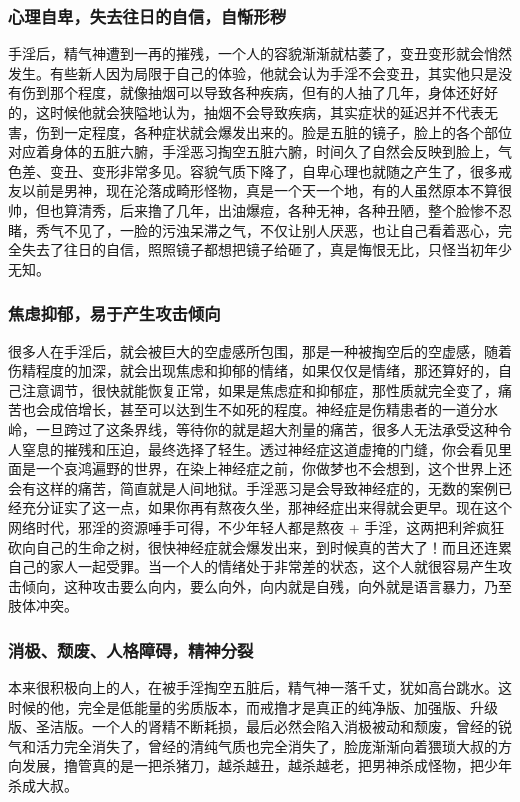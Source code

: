 \subsubsection{心理自卑，失去往日的自信，自惭形秽}

手淫后，精气神遭到一再的摧残，一个人的容貌渐渐就枯萎了，变丑变形就会悄然发生。有些新人因为局限于自己的体验，他就会认为手淫不会变丑，其实他只是没有伤到那个程度，就像抽烟可以导致各种疾病，但有的人抽了几年，身体还好好的，这时候他就会狭隘地认为，抽烟不会导致疾病，其实症状的延迟并不代表无害，伤到一定程度，各种症状就会爆发出来的。脸是五脏的镜子，脸上的各个部位对应着身体的五脏六腑，手淫恶习掏空五脏六腑，时间久了自然会反映到脸上，气色差、变丑、变形非常多见。容貌气质下降了，自卑心理也就随之产生了，很多戒友以前是男神，现在沦落成畸形怪物，真是一个天一个地，有的人虽然原本不算很帅，但也算清秀，后来撸了几年，出油爆痘，各种无神，各种丑陋，整个脸惨不忍睹，秀气不见了，一脸的污浊呆滞之气，不仅让别人厌恶，也让自己看着恶心，完全失去了往日的自信，照照镜子都想把镜子给砸了，真是悔恨无比，只怪当初年少无知。

\subsubsection{焦虑抑郁，易于产生攻击倾向}

很多人在手淫后，就会被巨大的空虚感所包围，那是一种被掏空后的空虚感，随着伤精程度的加深，就会出现焦虑和抑郁的情绪，如果仅仅是情绪，那还算好的，自己注意调节，很快就能恢复正常，如果是焦虑症和抑郁症，那性质就完全变了，痛苦也会成倍增长，甚至可以达到生不如死的程度。神经症是伤精患者的一道分水岭，一旦跨过了这条界线，等待你的就是超大剂量的痛苦，很多人无法承受这种令人窒息的摧残和压迫，最终选择了轻生。透过神经症这道虚掩的门缝，你会看见里面是一个哀鸿遍野的世界，在染上神经症之前，你做梦也不会想到，这个世界上还会有这样的痛苦，简直就是人间地狱。手淫恶习是会导致神经症的，无数的案例已经充分证实了这一点，如果你再有熬夜久坐，那神经症出来得就会更早。现在这个网络时代，邪淫的资源唾手可得，不少年轻人都是熬夜 + 手淫，这两把利斧疯狂砍向自己的生命之树，很快神经症就会爆发出来，到时候真的苦大了！而且还连累自己的家人一起受罪。当一个人的情绪处于非常差的状态，这个人就很容易产生攻击倾向，这种攻击要么向内，要么向外，向内就是自残，向外就是语言暴力，乃至肢体冲突。

\subsubsection{消极、颓废、人格障碍，精神分裂}

本来很积极向上的人，在被手淫掏空五脏后，精气神一落千丈，犹如高台跳水。这时候的他，完全是低能量的劣质版本，而戒撸才是真正的纯净版、加强版、升级版、圣洁版。一个人的肾精不断耗损，最后必然会陷入消极被动和颓废，曾经的锐气和活力完全消失了，曾经的清纯气质也完全消失了，脸庞渐渐向着猥琐大叔的方向发展，撸管真的是一把杀猪刀，越杀越丑，越杀越老，把男神杀成怪物，把少年杀成大叔。


